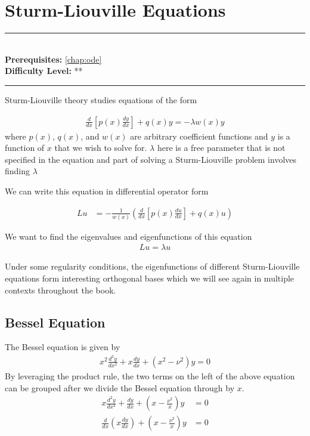 \documentclass[book.tex]{subfiles}
\begin{document}
\chapter{Sturm-Liouville Equations}
\label{chap:sturm_liouville}
\noindent\rule{11cm}{0.4pt} \\
\textbf{Prerequisites:} \autoref{chap:ode} \\ 
\textbf{Difficulty Level:} ** \\
\noindent\rule{11cm}{0.4pt}
\vspace{5mm}

Sturm-Liouville theory studies equations of the form

\begin{align}
    \frac{d}{dx} \left [ p(x) \frac{dy}{dx} \right ] + q(x) y = - \lambda w(x) y
\end{align}
where $p(x)$, $q(x)$, and $w(x)$ are arbitrary coefficient functions and $y$ is a function of $x$ that we wish to solve for. $\lambda$ here is a free parameter that is not specified in the equation and part of solving a Sturm-Liouville problem involves finding $\lambda$

We can write this equation in differential operator form

\begin{align}
    Lu &= -\frac{1}{w(x)} \left ( \frac{d}{dx} \left [ p(x) \frac{du}{dx} \right ] + q(x) u \right )
\end{align}

We want to find the eigenvalues and eigenfunctions of this equation
\begin{align}
    Lu = \lambda u
\end{align}

Under some regularity conditions, the eigenfunctions of different Sturm-Liouville equations form interesting orthogonal bases which we will see again in multiple contexts throughout the book.

\section{Bessel Equation}
The Bessel equation is given by
\begin{align}
    x^2 \frac{d^2y}{dx^2} + x \frac{dy}{dx} + (x^2 - \nu^2) y = 0
\end{align}
By leveraging the product rule, the two terms on the left of the above equation can be grouped after we divide the Bessel equation through by $x$.
\begin{align}
   x \frac{d^2y}{dx^2} + \frac{dy}{dx} + (x - \frac{\nu^2}{x}) y &= 0\\
   \frac{d}{dx} \left (x \frac{dy}{dx} \right) + \left (x - \frac{\nu^2}{x} \right) y &= 0
\end{align}
\end{document}
